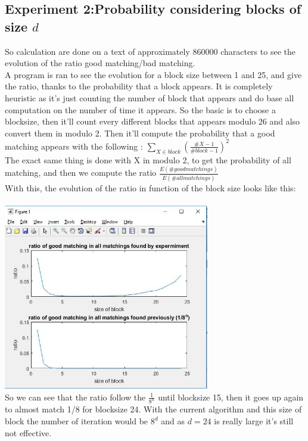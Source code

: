 \documentclass{article}
\begin{document}
\subsection*{Experiment 2:Probability considering blocks of size $d$}
So calculation are done on a text of approximately $860000$ characters to see the evolution of the ratio good matching/bad matching.\\
A program is ran to see the evolution for a block size between 1 and 25, and give the ratio, thanks to the probability that a block appears. It is completely heuristic as it's just counting the number of block that appears and do base all computation on the number of time it appears.
So the basic is to choose a blocksize, then it'll count every different blocks that appears modulo 26 and also convert them in modulo 2.
Then it'll compute the probability that a good matching appears with the following : $\sum_{X \in block}({\frac{\#X -1}{\#block -1}})^2 $\\
The exact same thing is done with X in modulo 2, to get the probability of all matching, and then we compute the ratio $\frac{E(\# good matchings)}{E(\# all matchings)}$\\
With this, the evolution of the ratio in function of the block size looks like this:\\
\\
\includegraphics[width=90mm]{ratio.jpg}\\
So we can see that the ratio follow the $\frac{1}{8^n}$ until blocksize 15, then it goes up again to almost match 1/8 for blocksize 24. With the current algorithm and this size of block the number of iteration would be $8^d$ and as $d = 24$ is really large it's still not effective.\\
\end{document}
